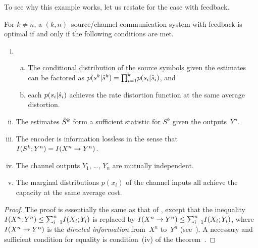 To see why this example works, let us restate  for the case with
feedback. 
\begin{theorem}
  \label{thm:tcntcfb}
  For $k \ne n$, a $(k, n)$~source/channel communication system with feedback is
  optimal if and only if the following conditions are met.
  \begin{enumerate}[(i)]
    \item
      \begin{enumerate}[(a)]
        \item The conditional distribution of the source symbols given the
          estimates can be factored as $p(s^k|{\hat{s}}^k) = {\prod_{i=1}^k} p(s_i|{\hat{s}}_i)$, and
        \item each $p(s_i|{\hat{s}}_i)$ achieves the rate distortion function at the
          same average distortion.
      \end{enumerate}

    \item The estimates ${\hat{S}}^k$ form a sufficient statistic for $S^k$ given the
      outputs~$Y^n$.

    \item The encoder is information lossless in the sense that $I(S^k; Y^n) =
      I(X^n \rightarrow Y^n)$. 

    \item The channel outputs $Y_1$, \ldots, $Y_n$ are mutually independent.

    \item The marginal distributions $p(x_i)$ of the channel inputs all achieve
      the capacity at the same average cost.
  \end{enumerate}
\end{theorem}

\begin{proof}
  The proof is essentially the same as that of , except that the
  inequality $I(X^n;Y^n) \le {\sum_{i=1}^n} I(X_i; Y_i)$ is replaced by $I(X^n \rightarrow Y^n) \le
  {\sum_{i=1}^n} I(X_i; Y_i)$, where $I(X^n \rightarrow Y^n)$ is the \emph{directed information}
  from~$X^n$ to~$Y^n$ (see~\cite{Massey1990,Kramer1998}). A necessary and
  sufficient condition for equality is condition~(iv) of the
  theorem~\cite[Theorem~2]{Massey1990}.
\end{proof}

